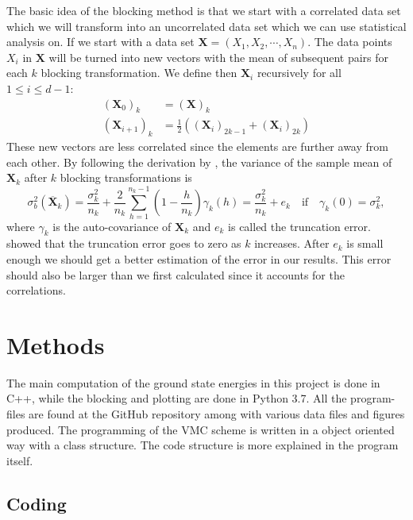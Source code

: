 \documentclass[12pt,a4paper,english]{article}
\begin{document}
The basic idea of the blocking method is that we start with a correlated data set which we will transform into an uncorrelated data set which we can use statistical analysis on. If we start with a data set $\textbf{X}=(X_1,X_2,\cdots,X_n)$. The data points $X_i$ in $\textbf{X}$ will be turned into new vectors with the mean of subsequent pairs for each $k$ blocking transformation. We define then $\textbf{X}_i$ recursively for all $1\leq i \leq d-1$:
\begin{align*}
(\textbf{X}_0)_k&=(\textbf{X})_k\\
(\textbf{X}_{i+1})_k&=\frac{1}{2}\left((\textbf{X}_i)_{2k-1}+(\textbf{X}_i)_{2k}\right)
\end{align*}
These new vectors are less correlated since the elements are further away from each other. By following the derivation by \citet{jonsson2018standard}, the variance of the sample mean of $\textbf{X}_k$ after $k$ blocking transformations is
\begin{equation}
\label{eq:blocking_var}
\sigma^2_b(\overline{\textbf{X}}_k)=\frac{\sigma_k^2}{n_k}+\frac{2}{n_k}\sum_{h=1}^{n_k-1}\left(1-\frac{h}{n_k}\right)\gamma_k(h)=\frac{\sigma_k^2}{n_k}+e_k\quad \text{if}\quad \gamma_k(0)=\sigma_k^2,
\end{equation}
where $\gamma_k$ is the auto-covariance of $\textbf{X}_k$ and $e_k$ is called the truncation error. \citet{flyvbjerg1989error} showed that the truncation error goes to zero as $k$ increases. After $e_k$ is small enough we should get a better estimation of the error in our results. This error should also be larger than we first calculated since it accounts for the correlations.

\section{Methods}
\label{sect:Methods}
The main computation of the ground state energies in this project is done in C++, while the blocking and plotting are done in Python 3.7. All the program-files are found at the GitHub repository \cite{GitHub} among with various data files and figures produced. The programming of the VMC scheme is written in a object oriented way with a class structure. The code structure is more explained in the program itself.

\subsection{Coding}
\label{subsect:Coding}
\end{document}

